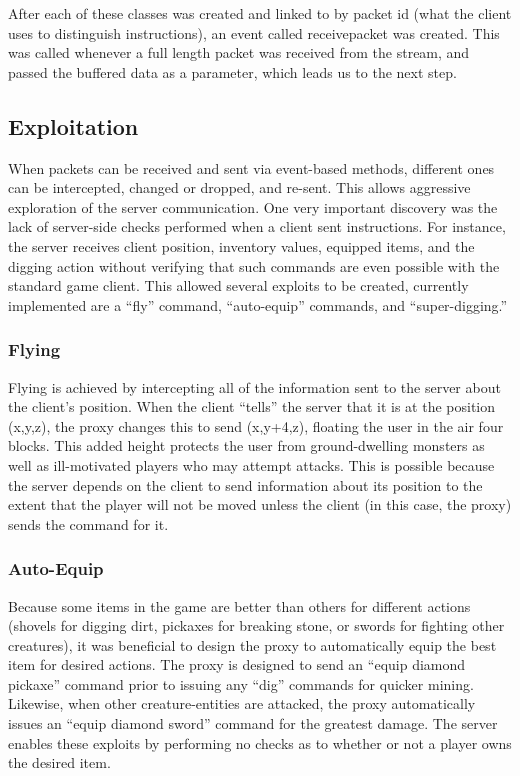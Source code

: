 \documentclass[12pt]{article}
\begin{document}
After each of these classes was created and linked to by packet id (what the client uses to distinguish instructions), an event called receive\textunderscore{}packet was created. This was called whenever a full length packet was received from the stream, and passed the buffered data as a parameter, which leads us to the next step.

\subsection{Exploitation}
When packets can be received and sent via event-based methods, different ones can be intercepted, changed or dropped, and re-sent. This allows aggressive exploration of the server communication. One very important discovery was the lack of server-side checks performed when a client sent instructions. For instance, the server receives client position, inventory values, equipped items, and the digging action without verifying that such commands are even possible with the standard game client. This allowed several exploits to be created, currently implemented are a ``fly'' command, ``auto-equip'' commands, and ``super-digging.''

\subsubsection{Flying}
Flying is achieved by intercepting all of the information sent to the server about the client's position. When the client ``tells'' the server that it is at the position (x,y,z), the proxy changes this to send (x,y+4,z), floating the user in the air four blocks. This added height protects the user from ground-dwelling monsters as well as ill-motivated players who may attempt attacks. This is possible because the server depends on the client to send information about its position to the extent that the player will not be moved unless the client (in this case, the proxy) sends the command for it.

\subsubsection{Auto-Equip}
Because some items in the game are better than others for different actions (shovels for digging dirt, pickaxes for breaking stone, or swords for fighting other creatures), it was beneficial to design the proxy to automatically equip the best item for desired actions. The proxy is designed to send an ``equip diamond pickaxe'' command prior to issuing any ``dig'' commands for quicker mining. Likewise, when other creature-entities are attacked, the proxy automatically issues an ``equip diamond sword'' command for the greatest damage. The server enables these exploits by performing no checks as to whether or not a player owns the desired item.
\end{document}
